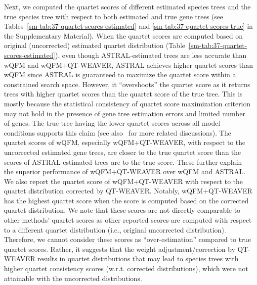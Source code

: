 \documentclass[10pt,a4paper]{article}
\begin{document}
Next, we computed the quartet scores of different estimated species trees and the true species tree with respect to both estimated and true gene trees (see Tables~\ref{sm-tab:37-quartet-scores-estimated} and \ref{sm-tab:37-quartet-scores-true} in the Supplementary Material). When the quartet scores are computed based on original (uncorrected) estimated quartet distribution (Table~\ref{sm-tab:37-quartet-scores-estimated}), even though ASTRAL-estimated trees are less accurate than wQFM and wQFM+QT-WEAVER, ASTRAL achieves higher quartet scores than wQFM since ASTRAL is guaranteed to maximize the quartet score within a constrained search space. However, it ``overshoots'' the quartet score as it returns trees with higher quartet scores than the quartet score of the true tree. %
This is mostly because the statistical consistency of quartet score maximization criterion may not hold in the presence of gene tree estimation errors and limited number of genes.
The true tree having the lower quartet scores across all model conditions supports this claim (see also~\cite{spterrace,farah2020phylogenomic,hasan2024leveraging} for more related discussions). %
The quartet scores of wQFM, especially wQFM+QT-WEAVER, with respect to the uncorrected estimated gene trees, are closer to the true quartet score than the scores of ASTRAL-estimated trees are to the true score. These further explain the superior performance of wQFM+QT-WEAVER over wQFM and ASTRAL. We also report the quartet score of wQFM+QT-WEAVER with respect to the quartet distribution corrected by QT-WEAVER. Notably, wQFM+QT-WEAVER has the highest quartet score when the score is computed based on the corrected quartet distribution. We note that these scores are not directly comparable to other methods' quartet scores as other reported scores are computed with respect to a different quartet distribution (i.e., original uncorrected distribution). Therefore, we cannot consider these scores as ``over-estimation'' compared to true quartet scores. Rather, it suggests that the weight adjustment/correction by QT-WEAVER results in quartet distributions that may lead to species trees with higher quartet consistency scores (w.r.t. corrected distributions), which were not attainable with the uncorrected distributions.
\end{document}
